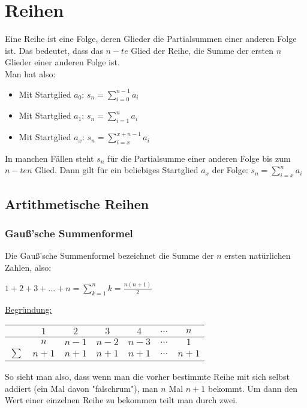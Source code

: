 \documentclass[main.tex]{subfiles}
\begin{document}
\chapter{Reihen}

\begin{Definition}
	Eine Reihe ist eine Folge, deren Glieder die Partialsummen einer anderen Folge ist. Das bedeutet, dass das $n-te$ Glied der Reihe, die Summe der ersten $n$ Glieder einer anderen Folge ist. \\
	Man hat also:

	\begin{itemize}
		\item Mit Startglied $a_{0}$: $s_{n}=\sum\limits_{i=0}^{n-1}a_{i}$
		\item Mit Startglied $a_{1}$: $s_{n}=\sum\limits_{i=1}^{n}a_{i}$
		\item Mit Startglied $a_{x}$: $s_{n}=\sum\limits_{i=x}^{x+n-1}a_{i}$
	\end{itemize}
\end{Definition}

\begin{Bemerkung}
	In manchen Fällen steht $s_{n}$ für die Partialsumme einer anderen Folge bis zum $n-ten$ Glied.
	Dann gilt für ein beliebiges Startglied $a_{x}$ der Folge: $s_{n}=\sum\limits_{i=x}^{n}a_{i}$
\end{Bemerkung}

\section{Artithmetische Reihen}
\subsection{Gauß'sche Summenformel}

Die Gauß'sche Summenformel bezeichnet die Summe der $n$ ersten natürlichen Zahlen, also:

$1+2+3+...+n=\sum\limits_{k=1}^{n}k=\frac{n(n+1)}{2}$


\begin{minipage}[c]{0.5\textwidth}
	\underline{Begründung:}

	\begin{tabular}{c | c | c | c | c | c| c}
		& $1$ & $2$ & $3$ & $4$ & $...$ & $n$ \\
		\hline
		& $n$ & $n-1$ & $n-2$ & $n-3$ & $...$ & $1$ \\
		 \hline
		$\sum$ & $n+1$ & $n+1$ & $n+1$ & $n+1$ & $...$ & $n+1$ \\
	\end{tabular}
\end{minipage}
\begin{minipage}{0.5\textwidth}
	So sieht man also, dass wenn man die vorher bestimmte Reihe mit sich selbst addiert (ein Mal davon "falschrum"), man $n$ Mal $n+1$ bekommt. Um dann den Wert einer einzelnen Reihe zu bekommen teilt man durch zwei.
\end{minipage}
\end{document}
